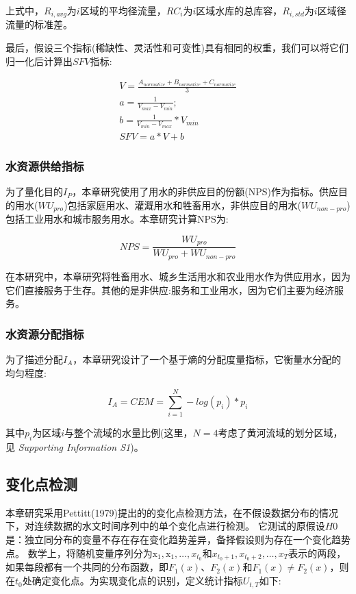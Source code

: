上式中，$R_{i, avg}$为$i$区域的平均径流量，$RC_i$为$i$区域水库的总库容，$R_{i, std}$为$i$区域径流量的标准差。

最后，假设三个指标(稀缺性、灵活性和可变性)具有相同的权重，我们可以将它们归一化后计算出$SFV$指标:

\begin{gather}
    V = \frac{A_{normalize} + B_{normalize} + C_{normalize}}{3}\\
    a = \frac{1}{V_{max} - V_{min}};\\
    b = \frac{1}{V_{min} - V_{max}} * V_{min}\\
    SFV = a * V + b
\end{gather}


\subsubsection*{水资源供给指标}

为了量化目的$I_P$，本章研究使用了用水的非供应目的份额(NPS)作为指标。供应目的用水($WU_{pro}$)包括家庭用水、灌溉用水和牲畜用水，非供应目的用水($WU_{non-pro}$)包括工业用水和城市服务用水。本章研究计算NPS为:

\begin{equation}
    NPS = \frac{WU_{pro}}{WU_{pro} + WU_{non-pro}}
\end{equation}

在本研究中，本章研究将牲畜用水、城乡生活用水和农业用水作为供应用水，因为它们直接服务于生存。其他的是非供应:服务和工业用水，因为它们主要为经济服务。

\subsubsection*{水资源分配指标}
为了描述分配$I_A$，本章研究设计了一个基于熵的分配度量指标，它衡量水分配的均匀程度:

\begin{equation}
    I_A = CEM = \sum_{i=1}^N -log(p_{i}) * p_{i}
\end{equation}

其中$p_{i}$为区域$i$与整个流域的水量比例(这里，$N=4$考虑了黄河流域的划分区域，见\textit{ Supporting  Information S1})。

\subsection{变化点检测}

本章研究采用Pettitt(1979)提出的的变化点检测方法，在不假设数据分布的情况下，对连续数据的水文时间序列中的单个变化点进行检测\cite{pettitt1979}。
它测试的原假设$H0$是：独立同分布的变量不存在存在变化趋势差异，备择假设则为存在一个变化趋势点。
数学上，将随机变量序列分为$\mathrm{x}_{1}, \mathrm{x}_{1}, \ldots, x_{t_{0}}$和$x_{t_{0}+1}, x_{t_{0}+2}, \ldots, x_{T}$表示的两段，如果每段都有一个共同的分布函数，即$F_1(x)$、$F_2(x)$和$F_1(x) \neq F_2(x)$，则在$t_0$处确定变化点。为实现变化点的识别，定义统计指标$U_{t,T}$如下:

